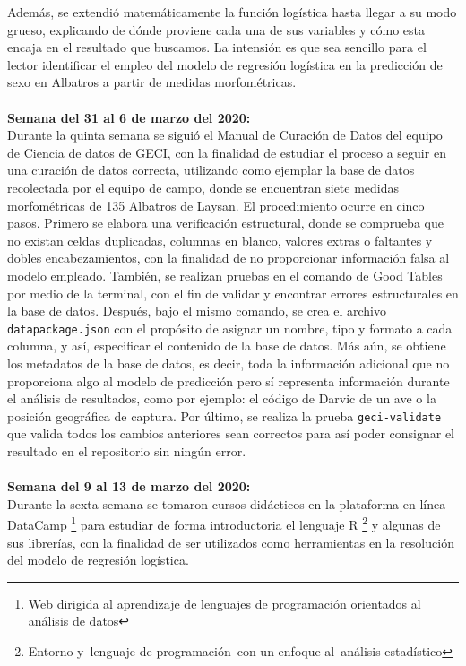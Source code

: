\documentclass{article}
\begin{document}
    Además, se extendió matemáticamente la función logística hasta llegar a su modo grueso, explicando de dónde proviene cada una de sus variables y cómo esta encaja en el resultado que buscamos. La intensión es que sea sencillo para el lector identificar el empleo del modelo de regresión logística en la predicción de sexo en Albatros a partir de medidas morfométricas. 
    \\ \\
    \textbf{Semana del 31 al 6 de marzo del 2020:} \\
    Durante la quinta semana se siguió el Manual de Curación de Datos del equipo de Ciencia de datos de GECI, con la finalidad de estudiar el proceso a seguir en una curación de datos correcta, utilizando como ejemplar la base de datos recolectada por el equipo de campo, donde se encuentran siete medidas morfométricas de 135 Albatros de Laysan.
    El procedimiento ocurre en cinco pasos. Primero se elabora una verificación estructural, donde se comprueba que no existan celdas duplicadas, columnas en blanco, valores extras o faltantes y dobles encabezamientos, con la finalidad de no proporcionar información falsa al modelo empleado. También, se realizan pruebas en el comando de Good Tables por medio de la terminal, con el fin de validar y encontrar errores estructurales en la base de datos.
    Después, bajo el mismo comando, se crea el archivo \texttt{datapackage.json} con el propósito de asignar un nombre, tipo y formato a cada columna, y así, especificar el contenido de la base de datos. Más aún, se obtiene los metadatos de la base de datos, es decir, toda la información adicional que no proporciona algo al modelo de predicción pero sí representa información durante el análisis de resultados, como por ejemplo: el código de Darvic de un ave o la posición geográfica de captura.
    Por último, se realiza la prueba \texttt{geci-validate} que valida todos los cambios anteriores sean correctos para así poder consignar el resultado en el repositorio sin ningún error. 
    \\ \\
    \textbf{Semana del 9 al 13 de marzo del 2020:} \\
    Durante la sexta semana se tomaron cursos didácticos en la plataforma en línea DataCamp \footnote{Web dirigida al aprendizaje de lenguajes de programación orientados al análisis de datos} para estudiar de forma introductoria el lenguaje R \footnote{Entorno y lenguaje de programación con un enfoque al análisis estadístico} y algunas de sus librerías, con la finalidad de ser utilizados como herramientas en la resolución del modelo de regresión logística.
\end{document}
